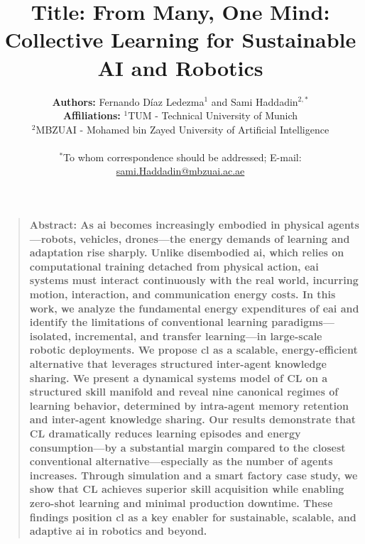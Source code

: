 \documentclass[12pt]{article}
\title{\textbf{Title:} From Many, One Mind: Collective Learning for Sustainable AI and Robotics}
\author
{\textbf{Authors:} Fernando D\'iaz Ledezma$ {}^{1}$ and Sami Haddadin${}^{2,\ast}$
	\\
	\normalsize{\textbf{Affiliations:} \normalsize{${}^{1}$TUM - Technical University of Munich}}\\
	\normalsize{${}^{2}$MBZUAI - Mohamed bin Zayed University of Artificial Intelligence}\\
	\\
	\normalsize{$^\ast$To whom correspondence should be addressed; E-mail: \url{sami.Haddadin@mbzuai.ac.ae}}
}
\date{}
\newenvironment{sciabstract}{%
\begin{quote} \bf}
{\end{quote}}
\begin{document}
 

\baselineskip24pt


\maketitle 



\begin{sciabstract}
	\textbf{Abstract:}
As \ac{ai} becomes increasingly embodied in physical agents---robots, vehicles, drones---the energy demands of learning and adaptation rise sharply. Unlike disembodied \ac{ai}, which relies on computational training detached from physical action, \ac{eai} systems must interact continuously with the real world, incurring motion, interaction, and communication energy costs. In this work, we analyze the fundamental energy expenditures of \ac{eai} and identify the limitations of conventional learning paradigms---isolated, incremental, and transfer learning---in large-scale robotic deployments. We propose \ac{cl} as a scalable, energy-efficient alternative that leverages structured inter-agent knowledge sharing. We present a dynamical systems model of CL on a structured skill manifold and reveal nine canonical regimes of learning behavior, determined by intra-agent memory retention and inter-agent knowledge sharing. Our results demonstrate that CL dramatically reduces learning episodes and energy consumption---by a substantial margin compared to the closest conventional alternative---especially as the number of agents increases. Through simulation and a smart factory case study, we show that CL achieves superior skill acquisition while enabling zero-shot learning and minimal production downtime. These findings position \ac{cl} as a key enabler for sustainable, scalable, and adaptive \ac{ai} in robotics and beyond.    
\end{sciabstract}
\end{document}
